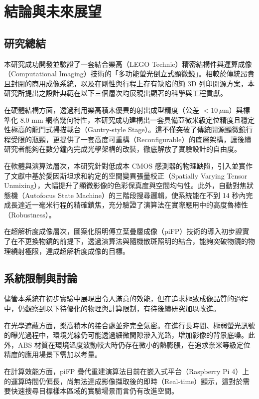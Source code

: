 
\chapter{結論與未來展望}

\section{研究總結}

本研究成功開發並驗證了一套結合樂高（LEGO Technic）精密結構件與運算成像（Computational Imaging）技術的「多功能螢光倒立式顯微鏡」。相較於傳統昂貴且封閉的商用成像系統，以及在剛性與行程上存有缺陷的純 3D 列印開源方案，本研究所提出之設計典範在以下三個層次均展現出顯著的科學與工程貢獻。

在硬體結構方面，透過利用樂高積木優異的射出成型精度（公差 $<10\,\mu$m）與標準化 8.0 mm 網格幾何特性，本研究成功建構出一套具備亞微米級定位精度且穩定性極高的龍門式掃描載台（Gantry-style Stage）。這不僅突破了傳統開源顯微鏡行程受限的瓶頸，更提供了一套高度可重構（Reconfigurable）的底層架構，讓後續研究者能夠在數分鐘內完成光學架構的改裝，徹底解放了實驗設計的自由度。

在軟體與演算法層次，本研究針對低成本 CMOS 感測器的物理缺陷，引入並實作了文獻中基於愛因斯坦求和約定的空間變異張量校正（Spatially Varying Tensor Unmixing），大幅提升了顯微影像的色彩保真度與空間均勻性。此外，自動對焦狀態機（Autofocus State Machine）的三階段搜尋邏輯，使系統能在不到 14 秒內完成長達近一毫米行程的精確鎖焦，充分驗證了演算法在實際應用中的高度魯棒性（Robustness）。

在超解析度成像層次，圖案化照明傅立葉疊層成像（piFP）技術的導入初步證實了在不更換物鏡的前提下，透過演算法與隨機散斑照明的結合，能夠突破物鏡的物理繞射極限，達成超解析度成像的目標。

\section{系統限制與討論}

儘管本系統在初步實驗中展現出令人滿意的效能，但在追求極致成像品質的過程中，仍觀察到以下待優化的物理與計算限制，有待後續研究加以改進。

在光學遮蔽方面，樂高積木的接合處並非完全氣密。在進行長時間、極弱螢光訊號的曝光過程中，環境光線仍可能透過細微間隙滲入光路，增加影像的背景底噪。此外，ABS 材質在環境溫度波動較大時仍存在微小的熱膨脹，在追求奈米等級定位精度的應用場景下需加以考量。

在計算效能方面，piFP 疊代重建演算法目前在嵌入式平台（Raspberry Pi 4）上的運算時間仍偏長，尚無法達成影像擷取後的即時（Real-time）顯示，這對於需要快速搜尋目標樣本區域的實驗場景而言仍有改進空間。

